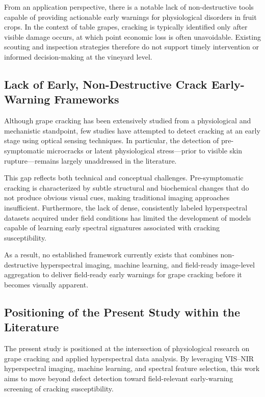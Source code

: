 \medskip
\noindent
From an application perspective, there is a notable lack of non-destructive tools capable
of providing actionable early warnings for physiological disorders in fruit crops. In the
context of table grapes, cracking is typically identified only after visible damage occurs,
at which point economic loss is often unavoidable. Existing scouting and inspection strategies therefore
do not support timely intervention or informed decision-making at the vineyard level.

\subsection{Lack of Early, Non-Destructive Crack Early-Warning Frameworks}
\label{subsec:gap_early_warning}

\noindent
Although grape cracking has been extensively studied from a physiological and
mechanistic standpoint, few studies have attempted to detect cracking at an
early stage using optical sensing techniques. In particular, the detection of pre-symptomatic
microcracks or latent physiological stress—prior to visible skin rupture—remains largely
unaddressed in the literature.

\medskip
\noindent
This gap reflects both technical and conceptual challenges. Pre-symptomatic cracking is
characterized by subtle structural and biochemical changes that do not produce obvious
visual cues, making traditional imaging approaches insufficient. Furthermore, the lack of
dense, consistently labeled hyperspectral datasets acquired under field conditions has limited
the development of models capable of learning early spectral signatures associated with cracking susceptibility.

\medskip
\noindent
As a result, no established framework currently exists that combines non-destructive
hyperspectral imaging, machine learning, and field-ready image-level aggregation to deliver field-ready
early warnings for grape cracking before it becomes visually apparent.

\subsection{Positioning of the Present Study within the Literature}
\label{subsec:gap_positioning}

\noindent


The present study is positioned at the intersection of physiological research on grape
cracking and applied hyperspectral data analysis. By leveraging VIS--NIR hyperspectral
imaging, machine learning, and spectral feature selection, this work aims to move beyond
defect detection toward field-relevant early-warning screening of cracking susceptibility.

